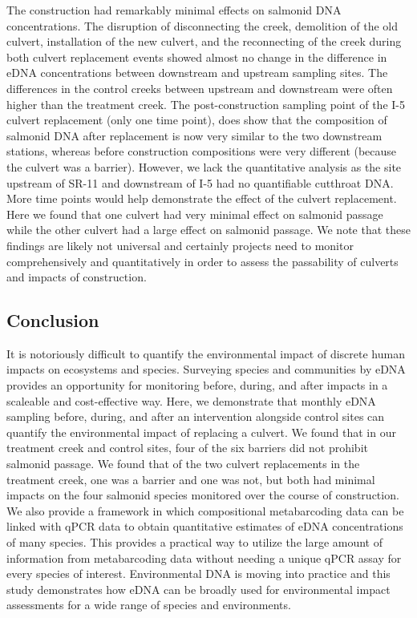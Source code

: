 \documentclass[
]{article}
\begin{document}
The construction had remarkably minimal effects on salmonid DNA
concentrations. The disruption of disconnecting the creek, demolition of
the old culvert, installation of the new culvert, and the reconnecting
of the creek during both culvert replacement events showed almost no
change in the difference in eDNA concentrations between downstream and
upstream sampling sites. The differences in the control creeks between
upstream and downstream were often higher than the treatment creek. The
post-construction sampling point of the I-5 culvert replacement (only
one time point), does show that the composition of salmonid DNA after
replacement is now very similar to the two downstream stations, whereas
before construction compositions were very different (because the
culvert was a barrier). However, we lack the quantitative analysis as
the site upstream of SR-11 and downstream of I-5 had no quantifiable
cutthroat DNA. More time points would help demonstrate the effect of the
culvert replacement. Here we found that one culvert had very minimal
effect on salmonid passage while the other culvert had a large effect on
salmonid passage. We note that these findings are likely not universal
and certainly projects need to monitor comprehensively and
quantitatively in order to assess the passability of culverts and
impacts of construction.

\hypertarget{conclusion}{%
\subsection{Conclusion}\label{conclusion}}

It is notoriously difficult to quantify the environmental impact of
discrete human impacts on ecosystems and species. Surveying species and
communities by eDNA provides an opportunity for monitoring before,
during, and after impacts in a scaleable and cost-effective way. Here,
we demonstrate that monthly eDNA sampling before, during, and after an
intervention alongside control sites can quantify the environmental
impact of replacing a culvert. We found that in our treatment creek and
control sites, four of the six barriers did not prohibit salmonid
passage. We found that of the two culvert replacements in the treatment
creek, one was a barrier and one was not, but both had minimal impacts
on the four salmonid species monitored over the course of construction.
We also provide a framework in which compositional metabarcoding data
can be linked with qPCR data to obtain quantitative estimates of eDNA
concentrations of many species. This provides a practical way to utilize
the large amount of information from metabarcoding data without needing
a unique qPCR assay for every species of interest. Environmental DNA is
moving into practice and this study demonstrates how eDNA can be broadly
used for environmental impact assessments for a wide range of species
and environments.
\end{document}

